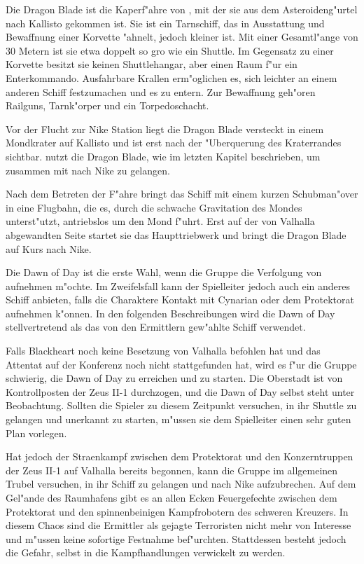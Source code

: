 
Die Dragon Blade ist die Kaperf"ahre von \xl{}, mit der sie aus dem Asteroideng"urtel nach Kallisto gekommen ist. Sie ist ein Tarnschiff, das in Ausstattung und Bewaffnung einer Korvette "ahnelt, jedoch kleiner ist. Mit einer Gesamtl"ange von 30 Metern ist sie etwa doppelt so gro\3 wie ein Shuttle. Im Gegensatz zu einer Korvette besitzt sie keinen Shuttlehangar, aber einen Raum f"ur ein Enterkommando. Ausfahrbare Krallen erm"oglichen es, sich leichter an einem anderen Schiff festzumachen und es zu entern. Zur Bewaffnung geh"oren Railguns, Tarnk"orper und ein Torpedoschacht.

Vor der Flucht zur Nike Station liegt die Dragon Blade versteckt in einem Mondkrater auf Kallisto und ist erst nach der "Uberquerung des Kraterrandes sichtbar. \xl{} nutzt die Dragon Blade, wie im letzten Kapitel beschrieben, um zusammen mit \ml{} nach Nike zu gelangen.

Nach dem Betreten der F"ahre bringt \xl{} das Schiff mit einem kurzen Schubman"over in eine Flugbahn, die es, durch die schwache Gravitation des Mondes unterst"utzt, antriebslos um den Mond f"uhrt. Erst auf der von Valhalla abgewandten Seite startet sie das Haupttriebwerk und bringt die Dragon Blade auf Kurs nach Nike.

Die Dawn of Day ist die erste Wahl, wenn die Gruppe die Verfolgung von \xl{} aufnehmen m"ochte. Im Zweifelsfall kann der Spielleiter jedoch auch ein anderes Schiff anbieten, falls die Charaktere Kontakt mit Cynarian oder dem Protektorat aufnehmen k"onnen. In den folgenden Beschreibungen wird die Dawn of Day stellvertretend als das von den Ermittlern gew"ahlte Schiff verwendet.

Falls Blackheart noch keine Besetzung von Valhalla befohlen hat und das Attentat auf der Konferenz noch nicht stattgefunden hat, wird es f"ur die Gruppe schwierig, die Dawn of Day zu erreichen und zu starten. Die Oberstadt ist von Kontrollposten der Zeus II-1 durchzogen, und die Dawn of Day selbst steht unter Beobachtung. Sollten die Spieler zu diesem Zeitpunkt versuchen, in ihr Shuttle zu gelangen und unerkannt zu starten, m"ussen sie dem Spielleiter einen sehr guten Plan vorlegen.

Hat jedoch der Stra\3enkampf zwischen dem Protektorat und den Konzerntruppen der Zeus II-1 auf Valhalla bereits begonnen, kann die Gruppe im allgemeinen Trubel versuchen, in ihr Schiff zu gelangen und nach Nike aufzubrechen. Auf dem Gel"ande des Raumhafens gibt es an allen Ecken Feuergefechte zwischen dem Protektorat und den spinnenbeinigen Kampfrobotern des schweren Kreuzers. In diesem Chaos sind die Ermittler als gejagte Terroristen nicht mehr von Interesse und m"ussen keine sofortige Festnahme bef"urchten. Stattdessen besteht jedoch die Gefahr, selbst in die Kampfhandlungen verwickelt zu werden.

